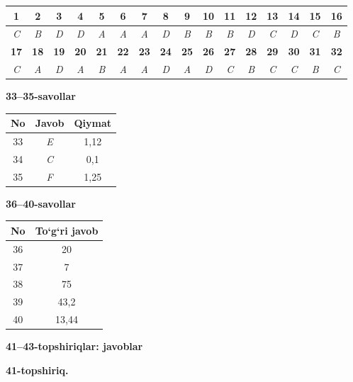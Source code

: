 \documentclass[11pt,a4paper]{article}
\begin{document}
\noindent\begin{tabular}{|c|c|c|c|c|c|c|c|c|c|c|c|c|c|c|c|}\hline
\textbf{1} & \textbf{2} & \textbf{3} & \textbf{4} & \textbf{5} & \textbf{6} & \textbf{7} & \textbf{8} & \textbf{9} & \textbf{10} & \textbf{11} & \textbf{12} & \textbf{13} & \textbf{14} & \textbf{15} & \textbf{16}\\\hline
\textsl{C} & \textsl{B} & \textsl{D} & \textsl{D} & \textsl{A} & \textsl{A} & \textsl{A} & \textsl{D} & \textsl{B} & \textsl{B} & \textsl{B} & \textsl{D} & \textsl{C} & \textsl{D} & \textsl{C} & \textsl{B}\\\hline
\textbf{17} & \textbf{18} & \textbf{19} & \textbf{20} & \textbf{21} & \textbf{22} & \textbf{23} & \textbf{24} & \textbf{25} & \textbf{26} & \textbf{27} & \textbf{28} & \textbf{29} & \textbf{30} & \textbf{31} & \textbf{32}\\\hline
\textsl{C} & \textsl{A} & \textsl{D} & \textsl{A} & \textsl{B} & \textsl{A} & \textsl{A} & \textsl{D} & \textsl{A} & \textsl{D} & \textsl{C} & \textsl{B} & \textsl{C} & \textsl{C} & \textsl{B} & \textsl{C}\\\hline
\end{tabular}\par\medskip
\noindent\textbf{33--35-savollar}\par\smallskip
\noindent\begin{tabular}{|c|c|c|}\hline \textbf{No} & \textbf{Javob} & \textbf{Qiymat}\\\hline
33 & \textsl{E} & 1,12\\\hline
34 & \textsl{C} & 0,1\\\hline
35 & \textsl{F} & 1,25\\\hline
\end{tabular}\par\medskip
\noindent\textbf{36--40-savollar}\par\smallskip
\noindent\begin{tabular}{|c|c|}\hline \textbf{No} & \textbf{To`g`ri javob}\\\hline
36 & 20\\\hline
37 & 7\\\hline
38 & 75\\\hline
39 & 43,2\\\hline
40 & 13,44\\\hline
\end{tabular}\par\medskip
\noindent\textbf{41--43-topshiriqlar: javoblar}\par\smallskip
\noindent\textbf{41-topshiriq.}\par
\end{document}
